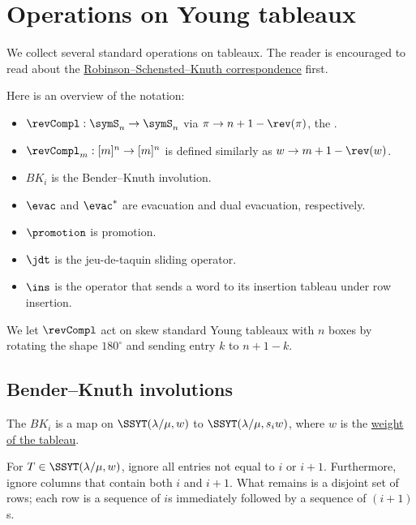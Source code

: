 

\section[tableauOperations]{Operations on Young tableaux}


We collect several standard operations on tableaux.
The reader is encouraged to read about
the \hyperref[rsk]{Robinson--Schensted--Knuth correspondence} first.


Here is an overview of the notation:
\begin{itemize}
\item $\revCompl : \symS_n \to \symS_n$ via $\pi \to n+1 - \rev(\pi)$,
  the \label{reverseComplementOperator}.
\item $\revCompl_m : [m]^n \to [m]^n$ is defined similarly as
$w \to m+1 - \rev(w)$.
\item $BK_i$ is the Bender--Knuth involution.
\item $\evac$ and $\evac^*$ are evacuation and dual evacuation, respectively.
\item $\promotion$ is promotion.
\item $\jdt$ is the jeu-de-taquin sliding operator.
\item $\ins$ is the operator that sends a word to its insertion tableau under row insertion.
\end{itemize}

We let $\revCompl$ act on skew standard Young tableaux with $n$ boxes by
rotating the shape $180^\circ$
and sending entry $k$ to $n+1-k$.


\subsection[benderKnuth]{Bender--Knuth involutions}

The \label{benderKnuthInvolution}
$BK_i$ is a map on $\SSYT(\lambda/\mu, w)$
to $\SSYT(\lambda/\mu, s_i w)$, where $w$
is the \hyperref[notationPermutations]{weight of the tableau}.

For $T \in \SSYT(\lambda/\mu, w)$, ignore all entries not equal to $i$ or $i+1$.
Furthermore, ignore columns that contain both $i$ and $i+1$.
What remains is a disjoint set of rows; each row is a sequence of $i$s immediately
followed by a sequence of $(i+1)$s.

